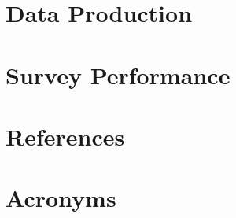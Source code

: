 \documentclass[SE,lsstdraft,authoryear,toc]{lsstdoc}
\begin{document}




\section{Data Production}



\section{Survey Performance} \label{sec:survey_performance}







\appendix
\section{References} \label{sec:bib}
\renewcommand{\refname}{} %


\section{Acronyms} \label{sec:acronyms}

\end{document}
